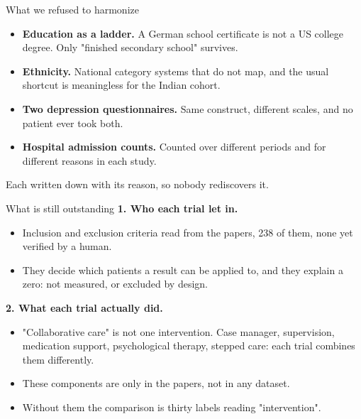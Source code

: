 \documentclass[11pt, t, handout]{beamer}
\newcommand{\ans}[1]{\textcolor{structure.fg}{#1}}
\begin{document}
\begin{frame}{What we refused to harmonize}
  \pause
  \begin{itemize}
    \setlength{\itemsep}{8pt}
    \item \textbf{Education as a ladder.} A German school certificate is not a
          US college degree. Only "finished secondary school" survives.
    \pause
    \item \textbf{Ethnicity.} National category systems that do not map, and
          the usual shortcut is meaningless for the Indian cohort.
    \pause
    \item \textbf{Two depression questionnaires.} Same construct, different
          scales, and no patient ever took both.
    \pause
    \item \textbf{Hospital admission counts.} Counted over different periods
          and for different reasons in each study.
  \end{itemize}
  \vspace{8pt}
  \pause
  {\footnotesize Each written down with its reason, so nobody rediscovers it.}
\end{frame}

\begin{frame}{What is still outstanding}
  \pause
  \textbf{1. Who each trial let in.}
  \vspace{4pt}
  \begin{itemize}\footnotesize
    \item Inclusion and exclusion criteria read from the papers, \ans{238 of
          them, none yet verified by a human}.
    \item They decide which patients a result can be applied to, and they
          explain a zero: not measured, or excluded by design.
  \end{itemize}
  \vspace{12pt}
  \pause
  \textbf{2. What each trial actually did.}
  \vspace{4pt}
  \begin{itemize}\footnotesize
    \item "Collaborative care" is not one intervention. Case manager,
          supervision, medication support, psychological therapy, stepped care:
          each trial combines them differently.
    \item These components are \ans{only in the papers}, not in any dataset.
    \item Without them the comparison is thirty labels reading "intervention".
  \end{itemize}
\end{frame}
\end{document}
